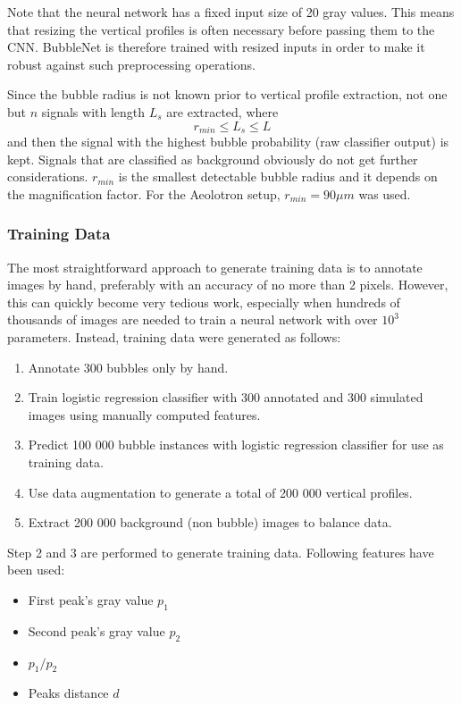 	Note that the neural network has a fixed input size of 20 gray values. This means that resizing the vertical profiles is often necessary before passing them to the CNN. BubbleNet is therefore trained with resized inputs in order to make it robust against such preprocessing operations. 
	
	Since the bubble radius is not known prior to vertical profile extraction, not one but $n$ signals with length $L_s$ are extracted, where 
	\begin{equation}
		r_{min} \leq L_s \leq L
	\end{equation}
	and then the signal with the highest bubble probability (raw classifier output) is kept. Signals that are classified as background obviously do not get further considerations. $r_{min}$ is the smallest detectable bubble radius and it depends on the magnification factor. For the Aeolotron setup, $r_{min} = 90 \mu m$ was used.

		\subsubsection{Training Data}
			The most straightforward approach to generate training data is to annotate images by hand, preferably with an accuracy of no more than 2 pixels. However, this can quickly become very tedious work, especially when hundreds of thousands of images are needed to train a neural network with over $10^{3}$ parameters. Instead, training data were generated as follows:
			\begin{enumerate}
				\item Annotate 300 bubbles only by hand.
				\item Train logistic regression classifier with 300 annotated and 300 simulated images using manually computed features.
				\item Predict 100 000 bubble instances with logistic regression classifier for use as training data. 
				\item Use data augmentation to generate a total of 200 000 vertical profiles. 				
				\item Extract 200 000 background (non bubble) images to balance data.
			\end{enumerate}
			
			Step 2 and 3 are performed to generate training data. Following features have been used:
			\begin{itemize}
				\item First peak's gray value $p_1$
				\item Second peak's gray value $p_2$
				\item $p_1/p_2$
				\item Peaks distance $d$
			\end{itemize}
			
